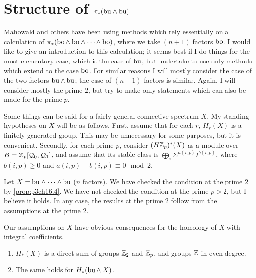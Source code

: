 \documentclass[../main]{subfiles}
\begin{document}
\chapter{Structure of \texorpdfstring{$\pi_*(\mathrm{bu}\wedge \mathrm{bu})$}{pi(bu wedge bu)}}
\label{sec:p3c17}
Mahowald and others have been using methods which rely essentially on a calculation of $\pi_*(\mathrm{bo}\wedge\mathrm{bo}\wedge\cdots\wedge\mathrm{bo})$, where we take $(n+1)$ factors $\mathrm{bo}$. I would like to give an introduction to this calculation; it seems best if I do things for the most elementary case, which is the case of $\mathrm{bu}$, but undertake to use only methods which extend to the case $\mathrm{bo}$. For similar reasons I will mostly consider the case of the two factors $\mathrm{bu}\wedge\mathrm{bu}$; the case of $(n+1)$ factors is similar. Again, I will consider mostly the prime $2$, but try to make only statements which can also be made for the prime $p$.

Some things can be said for a fairly general connective spectrum $X$.
My standing hypotheses on $X$ will be as follows. First, assume that for each $r$, $H_r(X)$ is a finitely generated group. This may be unnecessary for some purposes, but it is convenient. Secondly, for each prime $p$, consider $(H\mathbb{Z}_p)^*(X)$ as a module over $B = \mathbb{Z}_p[\mathcal{Q}_0,\mathcal{Q}_1]$, and assume that its stable class is $\bigoplus_i\Sigma^{a(i,p)}I^{b(i,p)}$, where $b(i,p) \ge 0$ and $a(i,p) + b(i,p) \equiv 0 \mod 2$.

\begin{examples}
Let $X = \mathrm{bu}\wedge\cdots\wedge\mathrm{bu}$ ($n$ factors). We have checked the condition at the prime $2$ by \ref{prop:p3ch16.4}. We have not checked the condition at the prime $p>2$, but I believe it holds. In any case, the results at the
prime $2$ follow from the assumptions at the prime $2$.
\end{examples}

Our assumptions on $X$ have obvious consequences for the homology
of $X$ with integral coefficients.

\begin{lemma} \label{lem:p3c17.1}
    \begin{enumerate}[label=(\roman*)]
    \item $H_*(X)$ is a direct sum of groups $\mathbb{Z}_2$ and $\mathbb{Z}_p$, and groups $\mathbb{Z}$ in even degree.
    \item The same holds for $H_*(\mathrm{bu}\wedge X)$.
    \end{enumerate}
\end{lemma}
\end{document}
